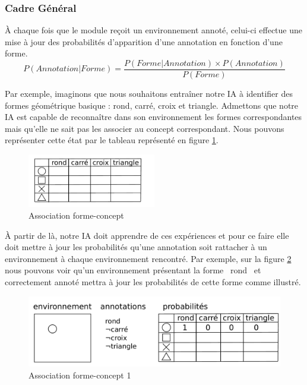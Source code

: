 
\subsubsection{Cadre Général}


À chaque fois que le module reçoit un environnement annoté, celui-ci effectue une mise à jour des probabilités d'apparition d'une annotation en fonction d'une forme.
\[ P(Annotation|Forme) = \frac{P(Forme|Annotation) \times P(Annotation)}{P(Forme)} \]

Par exemple, imaginons que nous souhaitons entraîner notre IA à identifier des formes géométrique basique : rond, carré, croix et triangle. Admettons que notre IA est capable de reconnaître dans son environnement les formes correspondantes mais qu'elle ne sait pas les associer au concept correspondant. Nous pouvons représenter cette état par le tableau représenté en figure \ref{img_annotations}.

\begin{figure}[H] 
  \begin{center}
    \includegraphics[width=0.5\textwidth]{files/raisonneur/annotations} 
  \end{center}
\caption{Association forme-concept} 
\label{img_annotations}
\end{figure}

À partir de là, notre IA doit apprendre de ces expériences et pour ce faire elle doit mettre à jour les probabilités qu'une annotation soit rattacher à un environnement à chaque environnement rencontré. Par exemple, sur la figure \ref{img_annotations_1} nous pouvons voir qu'un environnement présentant la forme \og{}~rond~\fg{} et correctement annoté mettra à jour les probabilités de cette forme comme illustré.

\begin{figure}[H] 
\includegraphics[width=\textwidth]{files/raisonneur/annotations_1} 
\caption{Association forme-concept 1} 
\label{img_annotations_1}
\end{figure}


